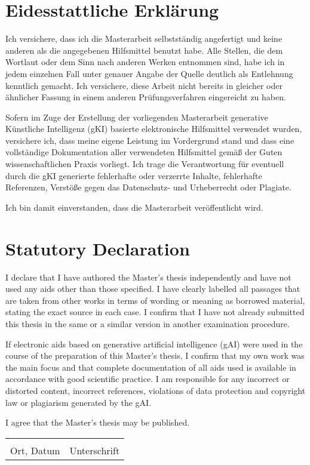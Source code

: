 \documentclass{scrreport}
\begin{document}
\section*{Eidesstattliche Erklärung}

Ich versichere, dass ich die Masterarbeit selbstständig angefertigt und keine anderen als die angegebenen Hilfsmittel benutzt habe.
Alle Stellen, die dem Wortlaut oder dem Sinn nach anderen Werken entnommen sind, habe ich in jedem einzelnen Fall unter genauer Angabe der Quelle deutlich als Entlehnung kenntlich gemacht. 
Ich versichere, diese Arbeit nicht bereits in gleicher oder ähnlicher Fassung in einem anderen Prüfungsverfahren eingereicht zu haben.

Sofern im Zuge der Erstellung der vorliegenden Masterarbeit generative Künstliche Intelligenz (gKI) basierte elektronische Hilfsmittel verwendet wurden, versichere ich, dass meine eigene Leistung im Vordergrund stand und dass eine vollständige Dokumentation aller verwendeten Hilfsmittel gemäß der Guten
wissenschaftlichen Praxis vorliegt.
Ich trage die Verantwortung für eventuell durch die gKI generierte fehlerhafte oder verzerrte Inhalte, fehlerhafte Referenzen, Verstöße gegen das Datenschutz- und Urheberrecht oder Plagiate.

Ich bin damit einverstanden, dass die Masterarbeit veröffentlicht wird.


\section*{\textcolor{UHHgray}{Statutory Declaration}}

{\color{UHHgray}
I declare that I have authored the Master's thesis independently and have not used any aids other than those specified.
I have clearly labelled all passages that are taken from other works in terms of wording or meaning as borrowed material, stating the exact source in each case.
I confirm that I have not already submitted this thesis in the same or a similar version in another examination procedure.

If electronic aids based on generative artificial intelligence (gAI) were used in the course of the preparation of this Master's thesis, I confirm that my own work was the main focus and that complete documentation of all aids used is available in accordance with good scientific practice.
I am responsible for any incorrect or distorted content, incorrect references, violations of data protection and copyright law or plagiarism generated by the gAI.

I agree that the Master's thesis may be published.

}

\vspace{2cm}

\begin{tabular}{@{}p{}p{8cm}@{}}
    \hrulefill & \hrulefill \\
    Ort, Datum & Unterschrift \\
\end{tabular}
    
\end{document}
